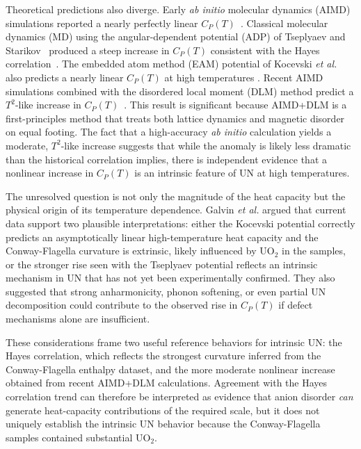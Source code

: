 \documentclass[preprint,12pt,sort&compress]{elsarticle}
\newcommand{\?}{\stackrel{?}{=}}
\begin{document}
Theoretical predictions also diverge. Early \textit{ab initio} molecular dynamics (AIMD) simulations reported a nearly perfectly linear $C_{P}(T)$~\cite{Kocevski2023}. Classical molecular dynamics (MD) using the angular-dependent potential (ADP) of Tseplyaev and Starikov~\cite{Kuksin2016,Tseplyaev2016} produced a steep increase in $C_P(T)$ consistent with the Hayes correlation~\cite{AbdulHameed2024}. The embedded atom method (EAM) potential of Kocevski \textit{et al.}~\cite{Kocevski2022II} also predicts a nearly linear $C_P(T)$ at high temperatures \cite{AbdulHameed2024}. Recent AIMD simulations combined with the disordered local moment (DLM) method predict a $T^{2}$-like increase in $C_P(T)$~\cite{AbdulHameed2025}. This result is significant because AIMD+DLM is a first-principles method that treats both lattice dynamics and magnetic disorder on equal footing. The fact that a high-accuracy \textit{ab initio} calculation yields a moderate, $T^{2}$-like increase suggests that while the anomaly is likely less dramatic than the historical correlation implies, there is independent evidence that a nonlinear increase in $C_{P}(T)$ is an intrinsic feature of UN at high temperatures.

The unresolved question is not only the magnitude of the heat capacity but the physical origin of its temperature dependence. Galvin \textit{et al.} \cite{Galvin2023} argued that current data support two plausible interpretations: either the Kocevski potential correctly predicts an asymptotically linear high-temperature heat capacity and the Conway-Flagella curvature is extrinsic, likely influenced by UO$_2$ in the samples, or the stronger rise seen with the Tseplyaev potential reflects an intrinsic mechanism in UN that has not yet been experimentally confirmed. They also suggested that strong anharmonicity, phonon softening, or even partial UN decomposition could contribute to the observed rise in $C_P(T)$ if defect mechanisms alone are insufficient.

These considerations frame two useful reference behaviors for intrinsic UN: the Hayes correlation, which reflects the strongest curvature inferred from the Conway-Flagella enthalpy dataset, and the more moderate nonlinear increase obtained from recent AIMD+DLM calculations. Agreement with the Hayes correlation trend can therefore be interpreted as evidence that anion disorder \emph{can} generate heat-capacity contributions of the required scale, but it does not uniquely establish the intrinsic UN behavior because the Conway-Flagella samples contained substantial UO$_2$.
\end{document}
